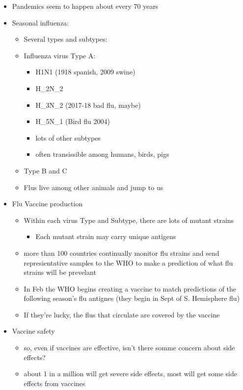 \documentclass{article}
\theoremstyle{definition}
\begin{document}
\begin{itemize}
\begin{itemize}
		\end{itemize}
	\item Pandemics seem to happen about every 70 years
	\item Seasonal influenza:
		\begin{itemize}
			\item Several types and subtypes:
			\item Influenza virus Type A:
				\begin{itemize}
					\item H1N1 (1918 spanish, 2009 swine)
					\item H_2N_2
					\item H_3N_2 (2017-18 bad flu, maybe)
					\item H_5N_1 (Bird flu 2004)
					\item lots of other subtypes
					\item often transissible among humans, birds, pigs
				\end{itemize}
			\item Type B and C
			\item Flus live among other animals and jump to us
		\end{itemize}
	\item Flu Vaccine production
		\begin{itemize}
			\item Within each virus Type and Subtype, there are lots of mutant strains
				\begin{itemize}
					\item Each mutant  strain may carry unique antigens
				\end{itemize}
			\item more than 100 countries continually monitor flu strains and send represientative samples to the WHO to make a prediction of what flu strains will be prevelant
			\item In Feb the WHO begins creating a vaccine to match predictions of the following season's flu antignes (they begin in Sept of S. Hemisphere flu)
			\item If they're lucky, the flus that circulate are covered by the vaccine
		\end{itemize}
	\item Vaccine safety
		\begin{itemize}
			\item so, even if vaccines are effective, isn't there somme concern about side effects?
			\item about 1 in a million will get severe side effects, most will get some side effects from vaccines

\end{itemize}
\end{itemize}
\end{document}
